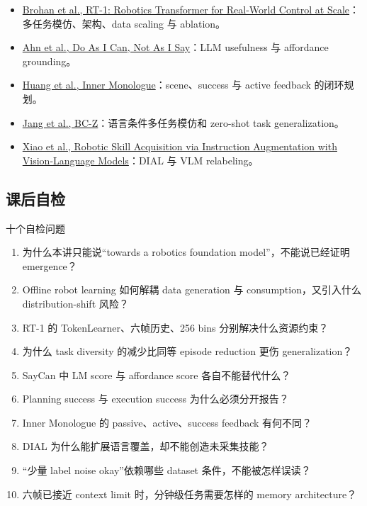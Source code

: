 \documentclass[a4paper]{article}
\begin{document}
\begin{itemize}
  \item \href{https://arxiv.org/abs/2212.06817}{Brohan et al., RT-1: Robotics Transformer for Real-World Control at Scale}：多任务模仿、架构、data scaling 与 ablation。
  \item \href{https://arxiv.org/abs/2204.01691}{Ahn et al., Do As I Can, Not As I Say}：LLM usefulness 与 affordance grounding。
  \item \href{https://arxiv.org/abs/2207.05608}{Huang et al., Inner Monologue}：scene、success 与 active feedback 的闭环规划。
  \item \href{https://arxiv.org/abs/2202.02005}{Jang et al., BC-Z}：语言条件多任务模仿和 zero-shot task generalization。
  \item \href{https://arxiv.org/abs/2211.11736}{Xiao et al., Robotic Skill Acquisition via Instruction Augmentation with Vision-Language Models}：DIAL 与 VLM relabeling。
\end{itemize}

\subsection{课后自检}

\begin{importantbox}{十个自检问题}
\begin{enumerate}
  \item 为什么本讲只能说“towards a robotics foundation model”，不能说已经证明 emergence？
  \item Offline robot learning 如何解耦 data generation 与 consumption，又引入什么 distribution-shift 风险？
  \item RT-1 的 TokenLearner、六帧历史、256 bins 分别解决什么资源约束？
  \item 为什么 task diversity 的减少比同等 episode reduction 更伤 generalization？
  \item SayCan 中 LM score 与 affordance score 各自不能替代什么？
  \item Planning success 与 execution success 为什么必须分开报告？
  \item Inner Monologue 的 passive、active、success feedback 有何不同？
  \item DIAL 为什么能扩展语言覆盖，却不能创造未采集技能？
  \item “少量 label noise okay”依赖哪些 dataset 条件，不能被怎样误读？
  \item 六帧已接近 context limit 时，分钟级任务需要怎样的 memory architecture？
\end{enumerate}
\end{importantbox}
\end{document}
